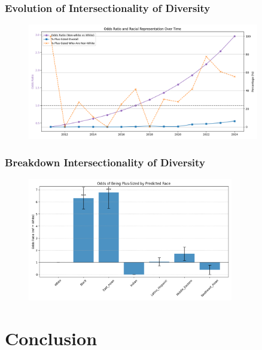\documentclass[aspectratio=169,xcolor=dvipsnames,10pt]{beamer}
\begin{document}
\begin{frame}[t]
    \frametitle{Evolution of Intersectionality of Diversity}
    \begin{figure}
            \begin{center}
            \includegraphics[width=0.9\textwidth]{figures/oddratio.png}
            \end{center}
        \end{figure}
\end{frame}

\begin{frame}[t]
    \frametitle{Breakdown Intersectionality of Diversity}
    \begin{figure}
            \begin{center}
            \includegraphics[width=0.8\textwidth]{figures/oddratio_race.png}
            \end{center}
        \end{figure}
\end{frame}

\section{Conclusion}
\end{document}
